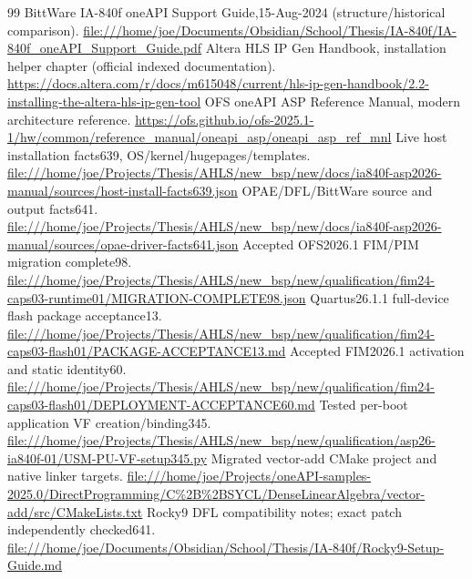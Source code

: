 \begingroup\small
\begin{thebibliography}{99}
 BittWare IA-840f oneAPI Support Guide,15-Aug-2024 (structure/historical comparison).
\newline\url{file:///home/joe/Documents/Obsidian/School/Thesis/IA-840f/IA-840f_oneAPI_Support_Guide.pdf}
 Altera HLS IP Gen Handbook, installation helper chapter (official indexed documentation).
\newline\url{https://docs.altera.com/r/docs/m615048/current/hls-ip-gen-handbook/2.2-installing-the-altera-hls-ip-gen-tool}
 OFS oneAPI ASP Reference Manual, modern architecture reference.
\newline\url{https://ofs.github.io/ofs-2025.1-1/hw/common/reference_manual/oneapi_asp/oneapi_asp_ref_mnl}
 Live host installation facts639, OS/kernel/hugepages/templates.
\newline\url{file:///home/joe/Projects/Thesis/AHLS/new_bsp/new/docs/ia840f-asp2026-manual/sources/host-install-facts639.json}
 OPAE/DFL/BittWare source and output facts641.
\newline\url{file:///home/joe/Projects/Thesis/AHLS/new_bsp/new/docs/ia840f-asp2026-manual/sources/opae-driver-facts641.json}
 Accepted OFS2026.1 FIM/PIM migration complete98.
\newline\url{file:///home/joe/Projects/Thesis/AHLS/new_bsp/new/qualification/fim24-caps03-runtime01/MIGRATION-COMPLETE98.json}
 Quartus26.1.1 full-device flash package acceptance13.
\newline\url{file:///home/joe/Projects/Thesis/AHLS/new_bsp/new/qualification/fim24-caps03-flash01/PACKAGE-ACCEPTANCE13.md}
 Accepted FIM2026.1 activation and static identity60.
\newline\url{file:///home/joe/Projects/Thesis/AHLS/new_bsp/new/qualification/fim24-caps03-flash01/DEPLOYMENT-ACCEPTANCE60.md}
 Tested per-boot application VF creation/binding345.
\newline\url{file:///home/joe/Projects/Thesis/AHLS/new_bsp/new/qualification/asp26-ia840f-01/USM-PU-VF-setup345.py}
 Migrated vector-add CMake project and native linker targets.
\newline\url{file:///home/joe/Projects/oneAPI-samples-2025.0/DirectProgramming/C%2B%2BSYCL/DenseLinearAlgebra/vector-add/src/CMakeLists.txt}
 Rocky9 DFL compatibility notes; exact patch independently checked641.
\newline\url{file:///home/joe/Documents/Obsidian/School/Thesis/IA-840f/Rocky9-Setup-Guide.md}

\end{thebibliography}

